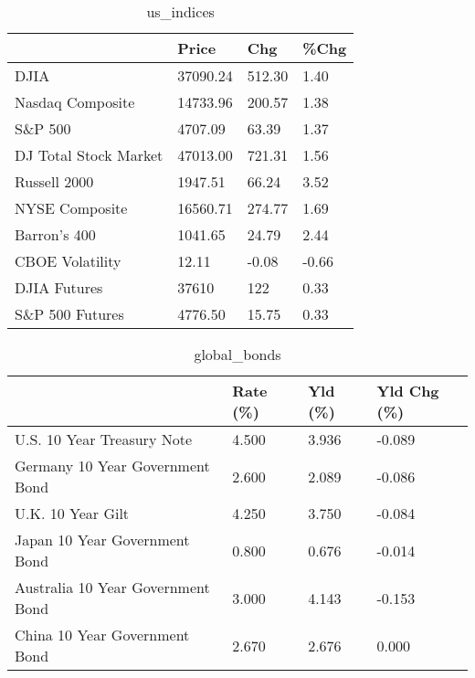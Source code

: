 \documentclass{article}%
\begin{document}
%


\begin{table}[htbp]%
\caption{us\_indices}%
\centering%
\begin{adjustbox}{width=1\textwidth}%
\begin{tabular}{llll}
\toprule
                      &    Price &    Chg &  \%Chg \\
\midrule
                 DJIA & 37090.24 & 512.30 &  1.40 \\
     Nasdaq Composite & 14733.96 & 200.57 &  1.38 \\
              S\&P 500 &  4707.09 &  63.39 &  1.37 \\
DJ Total Stock Market & 47013.00 & 721.31 &  1.56 \\
         Russell 2000 &  1947.51 &  66.24 &  3.52 \\
       NYSE Composite & 16560.71 & 274.77 &  1.69 \\
         Barron's 400 &  1041.65 &  24.79 &  2.44 \\
      CBOE Volatility &    12.11 &  -0.08 & -0.66 \\
         DJIA Futures &    37610 &    122 &  0.33 \\
      S\&P 500 Futures &  4776.50 &  15.75 &  0.33 \\
\bottomrule
\end{tabular}
%
\end{adjustbox}%
\end{table}

%


\begin{table}[htbp]%
\caption{global\_bonds}%
\centering%
\begin{adjustbox}{width=1\textwidth}%
\begin{tabular}{llll}
\toprule
                                  & Rate (\%) & Yld (\%) & Yld Chg (\%) \\
\midrule
       U.S. 10 Year Treasury Note &    4.500 &   3.936 &      -0.089 \\
  Germany 10 Year Government Bond &    2.600 &   2.089 &      -0.086 \\
                U.K. 10 Year Gilt &    4.250 &   3.750 &      -0.084 \\
    Japan 10 Year Government Bond &    0.800 &   0.676 &      -0.014 \\
Australia 10 Year Government Bond &    3.000 &   4.143 &      -0.153 \\
    China 10 Year Government Bond &    2.670 &   2.676 &       0.000 \\
\bottomrule
\end{tabular}
%
\end{adjustbox}%
\end{table}
\end{document}
